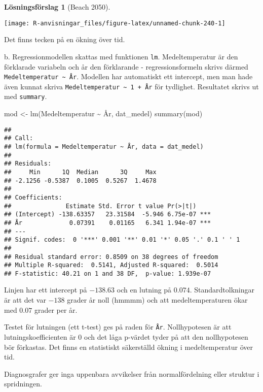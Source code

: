 \documentclass[
]{book}
\newenvironment{Shaded}{\begin{snugshade}}{\end{snugshade}}
\newcommand{\FunctionTok}[1]{\textcolor[rgb]{0.00,0.00,0.00}{#1}}
\newcommand{\NormalTok}[1]{#1}
\newcommand{\OtherTok}[1]{\textcolor[rgb]{0.56,0.35,0.01}{#1}}
\newcommand{\SpecialCharTok}[1]{\textcolor[rgb]{0.00,0.00,0.00}{#1}}
\theoremstyle{definition}
\theoremstyle{definition}
\theoremstyle{definition}
\theoremstyle{definition}
\newtheorem{hypothesis}{Lösningsförslag}[chapter]
\theoremstyle{remark}
\begin{document}
\begin{hypothesis}[Beach 2050]
\begin{center}\texttt{[image: R-anvisningar\_files/figure-latex/unnamed-chunk-240-1]} \end{center}

Det finns tecken på en ökning över tid.

b. Regressionmodellen skattas med funktionen \texttt{lm}. Medeltemperatur är den förklarade variabeln och år den förklarande - regressionsformeln skrivs därmed \texttt{Medeltemperatur\ \textasciitilde{}\ År}. Modellen har automatiskt ett intercept, men man hade även kunnat skriva \texttt{Medeltemperatur\ \textasciitilde{}\ 1\ +\ År} för tydlighet. Resultatet skrivs ut med \texttt{summary}.

\begin{Shaded}
\begin{Highlighting}[]
\NormalTok{mod }\OtherTok{\textless{}{-}} \FunctionTok{lm}\NormalTok{(Medeltemperatur }\SpecialCharTok{\textasciitilde{}}\NormalTok{ År, dat\_medel)}
\FunctionTok{summary}\NormalTok{(mod)}
\end{Highlighting}
\end{Shaded}

\begin{verbatim}
## 
## Call:
## lm(formula = Medeltemperatur ~ År, data = dat_medel)
## 
## Residuals:
##     Min      1Q  Median      3Q     Max 
## -2.1256 -0.5387  0.1005  0.5267  1.4678 
## 
## Coefficients:
##               Estimate Std. Error t value Pr(>|t|)    
## (Intercept) -138.63357   23.31584  -5.946 6.75e-07 ***
## År             0.07391    0.01165   6.341 1.94e-07 ***
## ---
## Signif. codes:  0 '***' 0.001 '**' 0.01 '*' 0.05 '.' 0.1 ' ' 1
## 
## Residual standard error: 0.8509 on 38 degrees of freedom
## Multiple R-squared:  0.5141, Adjusted R-squared:  0.5014 
## F-statistic: 40.21 on 1 and 38 DF,  p-value: 1.939e-07
\end{verbatim}

Linjen har ett intercept på \(-138.63\) och en lutning på \(0.074\). Standardtolkningar är att det var \(-138\) grader år noll (hmmmm) och att medeltemperaturen ökar med \(0.07\) grader per år.

Testet för lutningen (ett t-test) ges på raden för \texttt{År}. Nollhypotesen är att lutningskoefficienten är 0 och det låga p-värdet tyder på att den nollhypotesen bör förkastas. Det finns en statistiskt säkerställd ökning i medeltemperatur över tid.

Diagnosgrafer ger inga uppenbara avvikelser från normalfördelning eller struktur i spridningen.


\end{hypothesis}
\end{document}
